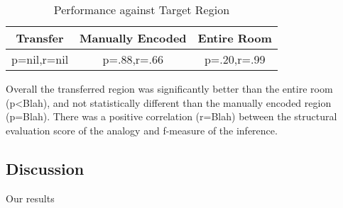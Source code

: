 \begin{table}
\small
\caption{Performance against Target Region}
\begin{tabular}{|c|c|c|}
\hline
Transfer & Manually Encoded & Entire Room \\
\hline
p=nil,r=nil & p=.88,r=.66 & p=.20,r=.99 \\
\hline
\end{tabular}
\end{table}


Overall the transferred region was significantly better than the entire room (p<Blah), and not statistically different than the manually encoded region (p=Blah). There was a positive correlation (r=Blah) between the structural evaluation score of the analogy and f-measure of the inference.


\subsection{Discussion}

Our results

